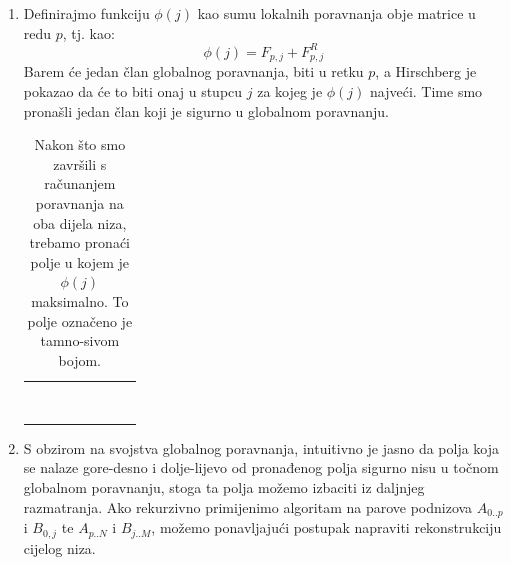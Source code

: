 \documentclass[times, utf8, zavrsni]{fer}
\begin{document}
\begin{enumerate}
\item
Definirajmo funkciju $\phi(j)$ kao sumu lokalnih poravnanja obje matrice u redu
$p$, tj. kao:
$$ \phi(j) = F_{p,j} + F^{R}_{p,j} $$
Barem će jedan član globalnog poravnanja, biti u retku $p$, a Hirschberg
je pokazao da će to biti onaj u stupcu $j$ za kojeg je $\phi(j)$ najveći.
Time smo pronašli jedan član koji je sigurno u globalnom poravnanju. 

\begin{table}
\centering
\begin{tabularx}{160pt}{|R|R|R|R|R|R|R|R|}
 \hline
  &  &  &  &  &  &  &  \\ \hline
  &  &  &  &  &  &  &  \\ \hline
  &  &  &  &  &  &  &  \\ \hline
  &  &  &  &  &  &  &  \\ \hline
   &   &   &   &   &   &   &   \\ \hline
  &  &  &  &  &  &  &  \\ \hline
  &  &  &  &  &  &  &  \\ \hline
  &  &  &  &  &  &  &  \\ \hline
  &  &  &  &  &  &  &  \\ \hline
\end{tabularx}
\caption[Hirschbergov algoritam: pronalazak elementa globalnog poravnanja]{
Nakon što smo završili s računanjem
poravnanja na oba dijela niza, trebamo pronaći polje u kojem je $\phi(j)$
maksimalno. To polje označeno je tamno-sivom bojom.}
\label{table:Halg:2}
\end{table}

\item
S obzirom na svojstva globalnog poravnanja, intuitivno je jasno da
polja koja se nalaze gore-desno i dolje-lijevo od pronađenog polja 
sigurno nisu u točnom globalnom poravnanju, stoga ta polja
možemo izbaciti iz daljnjeg razmatranja. Ako rekurzivno primijenimo
algoritam na parove podnizova $A_{0..p}$ i $B_{0,j}$ te $A_{p..N}$ i
$B_{j..M}$, možemo ponavljajući postupak napraviti rekonstrukciju
cijelog niza.


\end{enumerate}
\end{document}
